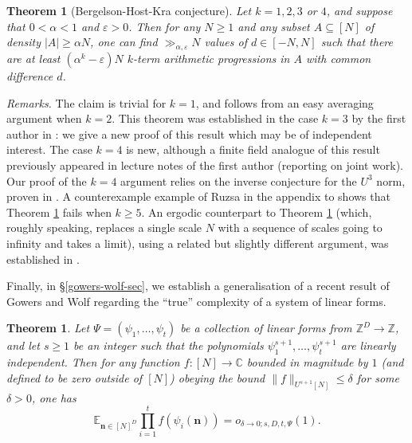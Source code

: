 \documentclass[11pt,reqno]{amsart}
\numberwithin{equation}{section}
\theoremstyle{plain}
\newtheorem{theorem}[subsection]{Theorem}
\theoremstyle{definition}
\renewcommand{\leq}{\leqslant}
\renewcommand{\geq}{\geqslant}
\newcommand\E{{\mathbb{E}}}
\newcommand\Z{\mathbb{Z}}
\newcommand\C{\mathbb{C}}
\newcommand\1{{\bf 1}}
\newcommand\2{{\bf 2}}
\newcommand\eps{\varepsilon}
\begin{document}
\begin{theorem}[Bergelson-Host-Kra conjecture]\label{bhk-thm}  Let $k = 1, 2, 3$ or $4$, and suppose that $0 < \alpha < 1$ and $\eps > 0$.  Then for any $N \geq 1$ and any subset $A \subseteq [N]$ of density $|A| \geq \alpha N$, one can find $\gg_{\alpha,\eps} N$ values of $d \in [-N,N]$ such that there are at least $(\alpha^k - \eps)N$ $k$-term arithmetic progressions in $A$ with common difference $d$.
\end{theorem}

\emph{Remarks.} The claim is trivial for $k=1$, and follows from an easy averaging argument when $k=2$.  This theorem was established in the case $k = 3$ by the first author in \cite{green-regularity}: we give a new proof of this result which may be of independent interest.  The case $k=4$ is new, although a finite field analogue of this result previously appeared in lecture notes of the first author \cite{green-montreal} (reporting on joint work).  Our proof of the $k=4$ argument relies on the inverse conjecture for the $U^3$ norm, proven in \cite{green-tao-u3inverse}. A counterexample example of Ruzsa in the appendix to \cite{bergelson-host-kra} shows that Theorem \ref{bhk-thm} fails when $k \geq 5$.  An ergodic counterpart to Theorem \ref{bhk-thm} (which, roughly speaking, replaces a single scale $N$ with a sequence of scales going to infinity and takes a limit), using a related but slightly different argument, was established in \cite{bergelson-host-kra}.

Finally, in \S \ref{gowers-wolf-sec}, we establish a generalisation of a recent result of Gowers and Wolf \cite{gowers-wolf-1,gowers-wolf-2,gowers-wolf-3} regarding the ``true'' complexity of a system of linear forms.

\begin{theorem}\label{gwolf}  Let $\Psi = (\psi_1,\ldots,\psi_t)$ be a collection of linear forms from $\Z^D \to \Z$, and let $s \geq 1$ be an integer such that the polynomials $\psi_1^{s+1},\ldots,\psi_t^{s+1}$ are linearly independent.  Then for any function $f: [N] \to \C$ bounded in magnitude by $1$ \textup{(}and defined to be zero outside of $[N]$\textup{)} obeying the bound $\|f\|_{U^{s+1}[N]} \leq \delta$ for some $\delta > 0$, one has
$$ \E_{\mathbf{n} \in [N]^D} \prod_{i=1}^t f( \psi_i(\mathbf{n}) ) = o_{\delta \to 0; s, D,t,\Psi}(1).$$
\end{theorem}
\end{document}
